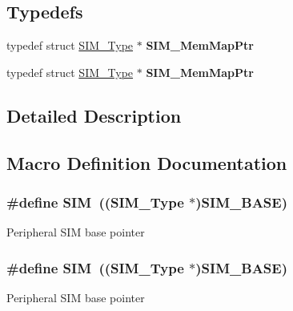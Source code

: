 \subsection*{Typedefs}
\begin{DoxyCompactItemize}
\item 
typedef struct \hyperlink{structSIM__Type}{S\+I\+M\+\_\+\+Type} $\ast$ {\bfseries S\+I\+M\+\_\+\+Mem\+Map\+Ptr}\hypertarget{group__SIM__Peripheral__Access__Layer_ga6b1611de1c2f6ea4b04ac7475d128850}{}\label{group__SIM__Peripheral__Access__Layer_ga6b1611de1c2f6ea4b04ac7475d128850}

\item 
typedef struct \hyperlink{structSIM__Type}{S\+I\+M\+\_\+\+Type} $\ast$ {\bfseries S\+I\+M\+\_\+\+Mem\+Map\+Ptr}\hypertarget{group__SIM__Peripheral__Access__Layer_ga6b1611de1c2f6ea4b04ac7475d128850}{}\label{group__SIM__Peripheral__Access__Layer_ga6b1611de1c2f6ea4b04ac7475d128850}

\end{DoxyCompactItemize}


\subsection{Detailed Description}


\subsection{Macro Definition Documentation}
\subsubsection[{\texorpdfstring{S\+IM}{SIM}}]{\setlength{\rightskip}{0pt plus 5cm}\#define S\+IM~(({\bf S\+I\+M\+\_\+\+Type} $\ast$){\bf S\+I\+M\+\_\+\+B\+A\+SE})}\hypertarget{group__SIM__Peripheral__Access__Layer_ga3dd2f4c4bfb41778902b4b5350143d9e}{}\label{group__SIM__Peripheral__Access__Layer_ga3dd2f4c4bfb41778902b4b5350143d9e}
Peripheral S\+IM base pointer 
\subsubsection[{\texorpdfstring{S\+IM}{SIM}}]{\setlength{\rightskip}{0pt plus 5cm}\#define S\+IM~(({\bf S\+I\+M\+\_\+\+Type} $\ast$){\bf S\+I\+M\+\_\+\+B\+A\+SE})}\hypertarget{group__SIM__Peripheral__Access__Layer_ga3dd2f4c4bfb41778902b4b5350143d9e}{}\label{group__SIM__Peripheral__Access__Layer_ga3dd2f4c4bfb41778902b4b5350143d9e}
Peripheral S\+IM base pointer 
